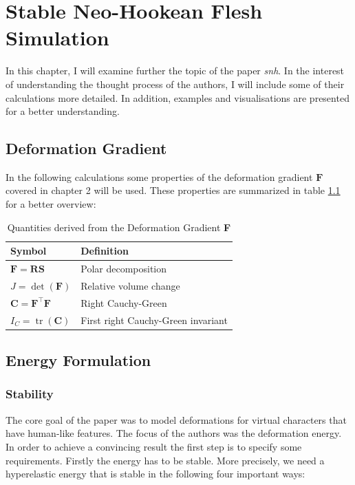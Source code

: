 \chapter{Stable Neo-Hookean Flesh Simulation} \label{c:Paper}
In this chapter, I will examine further the topic of the paper \textit{\acrshort{snh}}. In the interest of understanding the thought process of the authors, I will include some of their calculations more detailed. In addition, examples and visualisations are presented for a better understanding. 

\section{Deformation Gradient}
In the following calculations some properties of the deformation gradient $\mathbf{F}$ covered in chapter 2 will be used. These properties are summarized in table \ref{table:gradient_quantities} for a better overview:

\begin{table}[!htbp]
\centering
    \begin{tabular}{ | l | l |}
    \hline
    \textbf{Symbol} & \textbf{Definition} \\ \hline
    $\mathbf{F} = \mathbf{RS}$ & Polar decomposition \\ \hline
    $J=\operatorname{det}(\mathbf{F})$ & Relative volume change \\ \hline
    $\mathbf{C}=\mathbf{F}^\intercal \mathbf{F}$ & Right Cauchy-Green  \\ \hline	
    $I_{C}=\operatorname{tr}(\mathbf{C})$ & First right Cauchy-Green invariant \\ \hline
    \end{tabular}
    \caption[Quantities derived from the Deformation Gradient]{Quantities derived from the Deformation Gradient \textbf{F}}
\label{table:gradient_quantities}
\end{table}


\section{Energy Formulation}
\subsection{Stability}
The core goal of the paper was to model deformations for virtual characters that have human-like features. The focus of the authors was the deformation energy. In order to achieve a convincing result the first step is to specify some requirements. Firstly the energy has to be stable. More precisely, we need a hyperelastic energy that is stable in the following four important ways:

